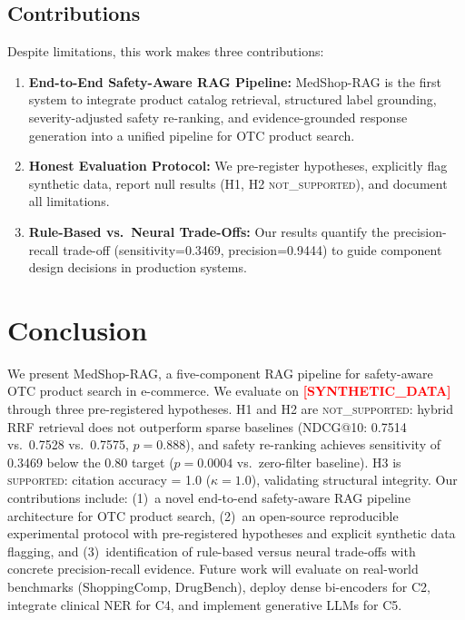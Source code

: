 \documentclass[conference]{IEEEtran}
\newcommand{\synflag}{\textcolor{red}{\textbf{[SYNTHETIC\_DATA]}}}
\begin{document}
\subsection{Contributions}

Despite limitations, this work makes three contributions:
\begin{enumerate}
  \item \textbf{End-to-End Safety-Aware RAG Pipeline:} MedShop-RAG is the first
    system to integrate product catalog retrieval, structured label grounding,
    severity-adjusted safety re-ranking, and evidence-grounded response
    generation into a unified pipeline for OTC product search.
  \item \textbf{Honest Evaluation Protocol:} We pre-register hypotheses,
    explicitly flag synthetic data, report null results (H1, H2
    \textsc{not\_supported}), and document all limitations.
  \item \textbf{Rule-Based vs.\ Neural Trade-Offs:} Our results quantify the
    precision-recall trade-off (sensitivity=0.3469, precision=0.9444) to guide
    component design decisions in production systems.
\end{enumerate}

\section{Conclusion}
\label{sec:conclusion}

We present MedShop-RAG, a five-component RAG pipeline for safety-aware OTC
product search in e-commerce. We evaluate on \synflag{} through three
pre-registered hypotheses. H1 and H2 are \textsc{not\_supported}: hybrid RRF
retrieval does not outperform sparse baselines (NDCG@10: 0.7514 vs.\ 0.7528
vs.\ 0.7575, $p{=}0.888$), and safety re-ranking achieves sensitivity of 0.3469
below the 0.80 target ($p{=}0.0004$ vs.\ zero-filter baseline). H3 is
\textsc{supported}: citation accuracy = 1.0 ($\kappa{=}1.0$), validating
structural integrity. Our contributions include: (1)~a novel end-to-end
safety-aware RAG pipeline architecture for OTC product search, (2)~an
open-source reproducible experimental protocol with pre-registered hypotheses
and explicit synthetic data flagging, and (3)~identification of rule-based
versus neural trade-offs with concrete precision-recall evidence. Future work
will evaluate on real-world benchmarks (ShoppingComp, DrugBench), deploy dense
bi-encoders for C2, integrate clinical NER for C4, and implement generative
LLMs for C5.
\end{document}
